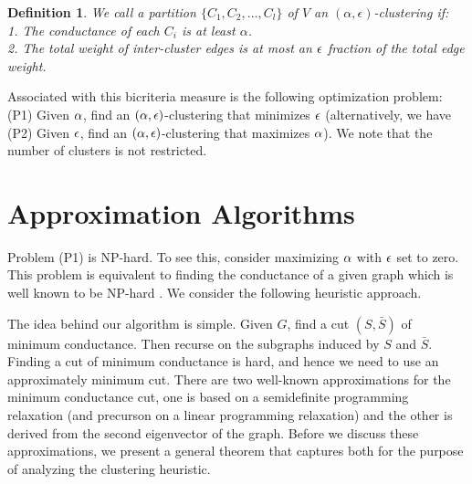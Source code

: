 \documentclass{book}
\newtheorem{definition}[theorem]{Definition}
\numberwithin{exercise}{chapter}
\begin{document}
\begin{definition}\label{condclus}
We call a partition $\{C_1,C_2,\ldots, C_l\}$ of $V$
an $(\alpha,\epsilon)$-clustering if:\\
1. The conductance of each $C_i$ is at least $\alpha$.\\
2. The total weight of inter-cluster edges is at most an $\epsilon$
fraction of the total edge weight.
\end{definition}

Associated with this bicriteria measure is the following
optimization problem:
(P1) Given $\alpha$, find an $(\alpha,\epsilon)$-clustering that minimizes $\epsilon$
(alternatively, we have (P2) Given $\epsilon$, find an $(\alpha,\epsilon)$-clustering that maximizes $\alpha$). We note that the number of clusters is not restricted.

\section{Approximation Algorithms}\label{sec:algo}
Problem (P1) is NP-hard. To see this, consider
maximizing $\alpha$ with $\epsilon$ set to zero. This problem is equivalent to finding the
conductance of a given graph which is well known to be NP-hard \cite{GJ79}. We consider the following heuristic approach.

\bigskip

\begin{center}
\end{center}

The idea behind our algorithm is simple. Given $G$, find a cut $(S,\bar{S})$ of minimum
conductance. Then recurse on the subgraphs induced by $S$ and $\bar{S}$.
Finding a cut of minimum conductance is hard, and hence we need to
use an approximately minimum cut.
There are two well-known approximations for the minimum conductance cut,
one is based on a semidefinite programming relaxation (and precurson on a linear programming relaxation) and the
other is derived from the second eigenvector of the graph. Before we
discuss these approximations, we present a general theorem that captures both for the purpose of analyzing the clustering heuristic.
\end{document}
